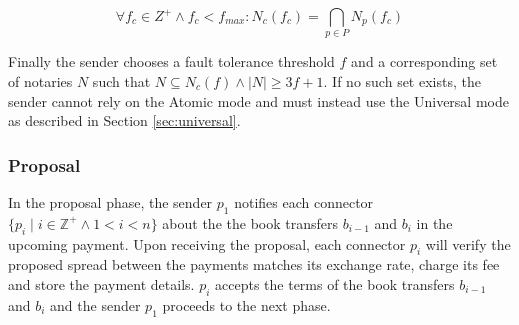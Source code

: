 \documentclass[letterpaper,twocolumn,10pt]{article}
\begin{document}
\begin{equation}
\forall f_c \in Z^+ \land f_c < f_{max} : N_c(f_c) = \bigcap_{p \in P} N_p(f_c)
\end{equation}

Finally the sender chooses a fault tolerance threshold $f$ and a corresponding set of notaries $N$ such that $N \subseteq N_c(f) \land \left\vert{N}\right\vert \geq 3f+1$. If no such set exists, the sender cannot rely on the Atomic mode and must instead use the Universal mode as described in Section \ref{sec:universal}.






\subsubsection{Proposal}

In the proposal phase, the sender $p_1$ notifies each connector $ \{ p_i \mid i \in \mathbb{Z}^+ \land 1 < i < n \} $ about the the book transfers $b_{i-1}$ and $b_i$ in the upcoming payment. Upon receiving the proposal, each connector $p_i$ will verify the proposed spread between the payments matches its exchange rate, charge its fee and store the payment details. $p_i$ accepts the terms of the book transfers $b_{i-1}$ and $b_i$ and the sender $p_1$ proceeds to the next phase.
\end{document}
